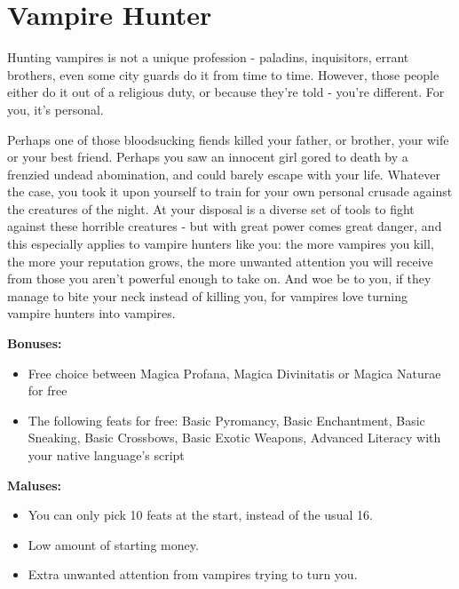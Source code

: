 \section{Vampire Hunter}
Hunting vampires is not a unique profession - paladins, inquisitors, errant brothers, even some city guards do it from time to time. However, those people either do it out of a  religious duty, or because they're told - you're different. For you, it's personal.

Perhaps one of those bloodsucking fiends killed your father, or brother, your wife or your best friend. Perhaps you saw an innocent girl gored to death by a frenzied undead abomination, and could barely escape with your life. Whatever the case, you took it upon yourself to train for your own personal crusade against the creatures of the night. At your disposal is a diverse set of tools to fight against these horrible creatures - but with great power comes great danger, and this especially applies to vampire hunters like you: the more vampires you kill, the more your reputation grows, the more unwanted attention you will receive from those you aren't powerful enough to take on. And woe be to you, if they manage to bite your neck instead of killing you, for vampires love turning vampire hunters into vampires.


\textbf{Bonuses:}
\begin{itemize}
	\item Free choice between Magica Profana, Magica Divinitatis or Magica Naturae for free
	\item The following feats for free: Basic Pyromancy, Basic Enchantment, Basic Sneaking, Basic Crossbows, Basic Exotic Weapons, Advanced Literacy with your native language's script
\end{itemize}


\textbf{Maluses:}
\begin{itemize}
	\item You can only pick 10 feats at the start, instead of the usual 16.
	\item Low amount of starting money.
	\item Extra unwanted attention from vampires trying to turn you. 
\end{itemize}
